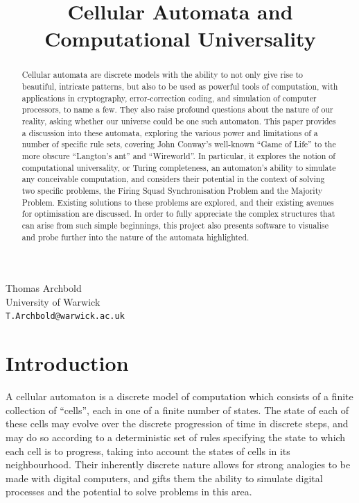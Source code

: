 \documentclass[11pt,a4paper]{article}
\title{Cellular Automata and Computational Universality}
\begin{document}
\maketitle

\begin{center}
    Thomas Archbold \\
    University of Warwick \\
    \texttt{T.Archbold@warwick.ac.uk}
\end{center}

\begin{abstract}
    Cellular automata are discrete models with the ability to not only give rise
    to beautiful, intricate patterns, but also to be used as powerful tools of
    computation, with applications in cryptography, error-correction coding, and
    simulation of computer processors, to name a few. They also raise profound
    questions about the nature of our reality, asking whether our universe could
    be one such automaton. This paper provides a discussion into these automata,
    exploring the various power and limitations of a number of specific rule
    sets, covering John Conway's well-known ``Game of Life'' to the more obscure
    ``Langton's ant'' and ``Wireworld''. In particular, it explores the notion
    of computational universality, or Turing completeness, an automaton's
    ability to simulate any conceivable computation, and considers their
    potential in the context of solving two specific problems, the Firing Squad
    Synchronisation Problem and the Majority Problem. Existing solutions to
    these problems are explored, and their existing avenues for optimisation are
    discussed. In order to fully appreciate the complex structures that can
    arise from such simple beginnings, this project also presents software to
    visualise and probe further into the nature of the automata highlighted.
\end{abstract}

\section{Introduction}
    A cellular automaton is a discrete model of computation which consists of a
    finite collection of ``cells'', each in one of a finite number of states.
    The state of each of these cells may evolve over the discrete progression of
    time in discrete steps, and may do so according to a deterministic set of
    rules specifying the state to which each cell is to progress, taking into
    account the states of cells in its neighbourhood. Their inherently discrete
    nature allows for strong analogies to be made with digital computers, and
    gifts them the ability to simulate digital processes and the potential to
    solve problems in this area. 
    
\end{document}
